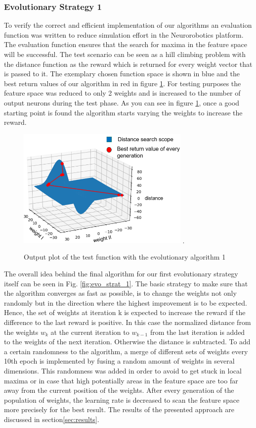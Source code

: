 \subsubsection{Evolutionary Strategy 1}
To verify the correct and efficient implementation of our algorithms an evaluation function was written to reduce simulation effort in the Neurorobotics platform. The evaluation function ensures that the search for maxima in the feature space will be successful. The test scenario can be seen as a hill climbing problem with the distance function as the reward which is returned for every weight vector that is passed to it. The exemplary chosen function space is shown in blue and the best return values of our algorithm in red in figure \ref{fig:test_function}. For testing purposes the feature space was reduced to only 2 weights and is increased to the number of output neurons during the test phase.
As you can see in figure \ref{fig:test_function}, once a good starting point is found the algorithm starts varying the weights to increase the reward. 


\begin{figure}[H]
	\centering
	\includegraphics[width=3.3in]{img/test_function.png}
	\DeclareGraphicsExtensions.
	\caption{Output plot of the test function with the evolutionary algorithm 1}
	\label{fig:test_function}
\end{figure}

The overall idea behind the final algorithm for our first evolutionary strategy itself can be seen in Fig. \ref{fig:evo_strat_1}. The basic strategy to make sure that the algorithm converges as fast as possible, is to change the weights not only randomly but in the direction where the highest improvement is to be expected. Hence, the set of weights at iteration k is expected to increase the reward if the difference to the last reward is positive. In this case the normalized distance from the weights $w_k$  at the current iteration to $w_{k-1}$ from the last iteration is added to the weights of the next iteration. Otherwise the distance is subtracted. To add a certain randomness to the algorithm, a merge of different sets of weights every 10th epoch is implemented by fusing a random amount of weights in several dimensions. This randomness was added in order to avoid to get stuck in local maxima or in case that high potentially areas in the feature space are too far away from the current position of the weights. After every generation of the population of weights, the learning rate is decreased to scan the feature space more precisely for the best result. 
The results of the presented approach are discussed in section\ref{sec:results}.

